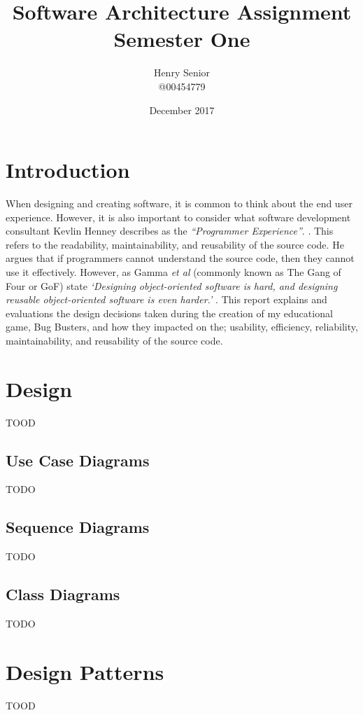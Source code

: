 \documentclass[a4paper,12pt]{article}
\begin{document}
	
\title{Software Architecture Assignment Semester One}
\author{Henry Senior\\@00454779}
\date{December 2017}

\maketitle

\section*{Introduction}
When designing and creating software, it is common to think about the end user experience. However, it is also important to consider what software development consultant Kevlin Henney describes as the \textit{``Programmer Experience''}. \cite{FizzBuzz}. This refers to the readability, maintainability, and reusability of the source code. He argues that if programmers cannot understand the source code, then they cannot use it effectively. However, as Gamma \textit{et al} (commonly known as The Gang of Four or GoF) state \textit{`Designing object-oriented software is hard, and designing reusable object-oriented software is even harder.'} \cite{GoF-Book}. This report explains and evaluations the design decisions taken during the creation of my educational game, Bug Busters, and how they impacted on the; usability, efficiency, reliability, maintainability, and reusability of the source code. 

\section*{Design}
TOOD

\subsection*{Use Case Diagrams}
TODO

\subsection*{Sequence Diagrams}
TODO

\subsection*{Class Diagrams}
TODO

\section*{Design Patterns}
TOOD
\end{document}
